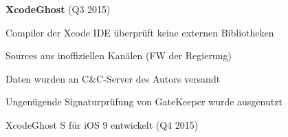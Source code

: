 \begin{frame}
	\centering
	\textbf{XcodeGhost} (Q3 2015)
	\begin{block}{}
		Compiler der Xcode IDE überprüft keine externen Bibliotheken
	\end{block}
	\begin{block}{}
		Sources aus inoffiziellen Kanälen (FW der Regierung)
	\end{block}
	\begin{block}{}
		Daten wurden an C\&C-Server des Autors versandt
	\end{block}
	\begin{block}{}
		Ungenügende Signaturprüfung von GateKeeper wurde ausgenutzt
	\end{block}
	\begin{block}{}
		XcodeGhost S für iOS 9 entwickelt (Q4 2015)
	\end{block}
\end{frame}